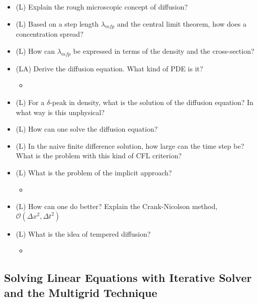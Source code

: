 \begin{itemize}
    \item (L) Explain the rough microscopic concept of diffusion?
    \item (L) Based on a step length $\lambda_{mfp}$ and the central limit theorem, how does a concentration spread?
    \item (L) How can $\lambda_{mfp}$ be expressed in terms of the density and the cross-section?
    \item (LA) Derive the diffusion equation. What kind of PDE is it?
    \begin{itemize}
        \item {}
    \end{itemize}
    \item (L) For a $\delta$-peak in density, what is the solution of the diffusion equation? In what way is this unphysical?
    \item (L) How can one solve the diffusion equation?
    \item (L) In the naive finite difference solution, how large can the time step be? What
    is the problem with this kind of CFL criterion?
    \item (L) What is the problem of the implicit approach?
    \begin{itemize}
        \item {}
    \end{itemize}
    \item (L) How can one do better? Explain the Crank-Nicolson method, $\mathcal{O}(\Delta x^2, \Delta t^2)$
    \item (L) What is the idea of tempered diffusion?
    \begin{itemize}
        \item {}
    \end{itemize}
\end{itemize}

\subsection*{Solving Linear Equations with Iterative Solver and the Multigrid Technique}

